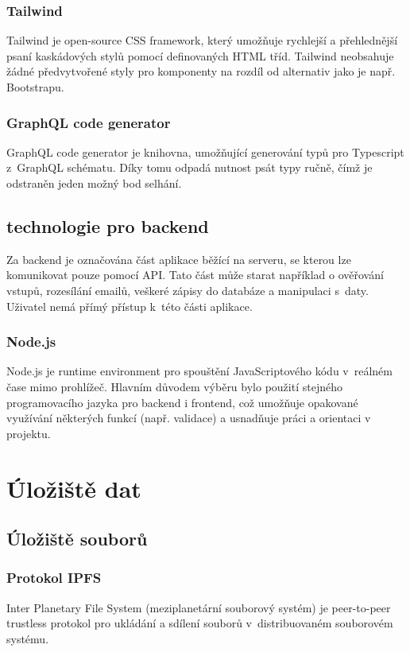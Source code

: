 \documentclass[12pt, a4paper,
  oneside,      %
]{report}
\begin{document}
\subsection{Tailwind}
Tailwind je open-source CSS framework, který umožňuje rychlejší a přehlednější psaní kaskádových stylů pomocí definovaných HTML tříd. Tailwind neobsahuje žádné předvytvořené styly pro komponenty na rozdíl od alternativ jako je např. Bootstrapu. \cite{bootstrap}\cite{tailwindDocumentation}

\subsection{GraphQL code generator}
GraphQL code generator je knihovna, umožňující generování typů pro Typescript z~GraphQL schématu. Díky tomu odpadá nutnost psát typy ručně, čímž je odstraněn jeden možný bod selhání. \cite{graphqlCodeGeneratorDocs}

\section{technologie pro backend}
Za backend je označována část aplikace běžící na serveru, se kterou lze komunikovat pouze pomocí API. Tato část může starat například o ověřování vstupů, rozesílání emailů, veškeré zápisy do databáze a manipulaci s~daty. Uživatel nemá přímý přístup k~této části aplikace. \cite{whatIsFrontend} %

\subsection{Node.js}
Node.js je runtime environment pro spouštění JavaScriptového kódu v~reálném čase mimo prohlížeč. Hlavním důvodem výběru bylo použití stejného programovacího jazyka pro backend i frontend, což umožňuje opakované využívání některých funkcí (např. validace) a usnadňuje práci a orientaci v projektu. \cite{aboutNodeJS}

\chapter{Úložiště dat}
\section{Úložiště souborů}
\subsection{Protokol IPFS}\label{subsection:IPFS}
Inter Planetary File System (meziplanetární souborový systém) je peer-to-peer trustless protokol pro ukládání a sdílení souborů v~distribuovaném souborovém systému. \cite{IPFSDocs}
\end{document}
